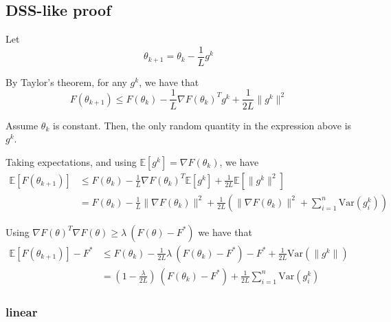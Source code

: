 \documentclass[11pt]{article}
\newcommand{\Var}{\mathrm{Var}}
\begin{document}
\subsection{DSS-like proof}

Let 
\begin{equation}
	\theta_{k+1} = \theta_k - \frac{1}{L} g^k 
\end{equation}

By Taylor's theorem, for any $g^k$, we have that 
\begin{equation}
	F(\theta_{k+1}) \leq F(\theta_k) - \frac{1}{L} \nabla F (\theta_k)^T g^k + \frac{1}{2L} \|g^k\|^2 
\end{equation}

Assume $\theta_k$ is constant. Then, the only random quantity in the expression above is $g^k$.

Taking expectations, and using $\mathbb{E} [g^k] = \nabla F(\theta_k)$, we have 
\begin{align*}
	\mathbb{E} [ F(\theta_{k+1}) ] & \leq F(\theta_k) - \frac{1}{L} \nabla F (\theta_k)^T\mathbb{E} [g^k] + \frac{1}{2L} \mathbb{E}[ \| g^k \|^2] \\
	& =F(\theta_k) - \frac{1}{L} \|\nabla F(\theta_k)\|^2 + \frac{1}{2L} (\|\nabla F(\theta_k)\|^2 + \sum_{i=1}^n \Var ( g^k_i) )
\end{align*}

Using $\nabla F(\theta)^T \nabla F(\theta) \geq \lambda \ (F(\theta ) - F^*)$ we have that
\begin{align*}
	\mathbb{E} [ F(\theta_{k+1}) ]  - F^* & \leq F(\theta_k) - \frac{1}{2L} \lambda \ (F(\theta_k) - F^*)   - F^*+ \frac{1}{2L}\Var (\| g^k\|) \\
                                          & =( 1-\frac{\lambda}{2L})  \ (F(\theta_k) - F^*)+ \frac{1}{2L}\sum_{i=1}^n \Var ( g^k_i)
\end{align*}

	
	\subsubsection{linear}
	
\end{document}
